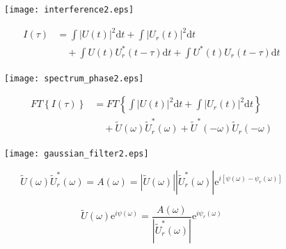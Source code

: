 \documentclass[11pt]{beamer}
\begin{document}
\begin{frame}
\vspace{10pt}
\begin{figure}
	\centering
	\texttt{[image: interference2.eps]}
\end{figure}
\vspace{-20pt}
\begin{align}
	I(\tau) 	&= \int|U(t)|^2\mathrm{d}t + \int|U_r(t)|^2\mathrm{d}t \nonumber\\
			&\quad + \int U(t)U_r^*(t-\tau)\mathrm{d}t + \int U^*(t)U_r(t-\tau)\mathrm{d}t 
	\label{eq_inter}
\end{align}
\end{frame}

\begin{frame}
\vspace{10pt}
\begin{figure}
	\centering
	\texttt{[image: spectrum\_phase2.eps]}
\end{figure}
\vspace{-20pt}
\begin{align}
	FT\left\lbrace I(\tau)\right\rbrace 	&= 	FT\left\lbrace \int|U(t)|^2\mathrm{d}t + \int|U_r(t)|^2\mathrm{d}t\right\rbrace \nonumber \\
			&\quad + \tilde{U}(\omega)\tilde{U}_r^*(\omega) + \tilde{U}^*(-\omega)\tilde{U}_r(-\omega)
	\label{eq_fourier}
\end{align}
\end{frame}

\begin{frame}
\vspace{10pt}
\begin{figure}
	\centering
	\texttt{[image: gaussian\_filter2.eps]}
\end{figure}
\begin{equation}
\tilde{U}(\omega)\tilde{U}_r^*(\omega) = A(\omega) = |\tilde{U}(\omega)||\tilde{U}_r^*(\omega)|\mathrm{e}^{i[\psi(\omega)-\psi_r(\omega)]}
	\label{eq_gauss}
\end{equation}
\end{frame}

\begin{frame}
\begin{equation}
\tilde{U}(\omega)\mathrm{e}^{i\psi(\omega)} = \frac{A(\omega)}{|\tilde{U}_r^*(\omega)|}\mathrm{e}^{i\psi_r(\omega)}
	\label{eq_field}
\end{equation}
\end{frame}
\end{document}
